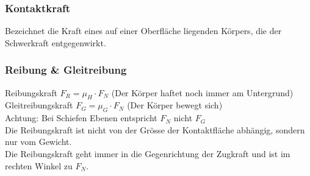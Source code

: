 \subsubsection{Kontaktkraft}
Bezeichnet die Kraft eines auf einer Oberfläche liegenden Körpers, die der Schwerkraft entgegenwirkt.\\


\subsubsection{Reibung \& Gleitreibung}
\begin{minipage}{15.5cm}
Reibungskraft $F_{R} = \mu_{H} \cdot F_{N}$ (Der Körper haftet noch immer am Untergrund)\\
Gleitreibungskraft $F_G =  \mu_{G} \cdot F_{N}$ (Der Körper bewegt sich) \\
Achtung: Bei Schiefen Ebenen entspricht $F_{N}$ nicht $F_{G}$ \\
Die Reibungskraft ist nicht von der Grösse der Kontaktfläche abhängig, sondern nur vom Gewicht. \\
Die Reibungskraft geht immer in die Gegenrichtung der Zugkraft und ist im rechten Winkel zu $F_{N}$.
\end{minipage}
\begin{minipage}{4cm}
\end{minipage}


